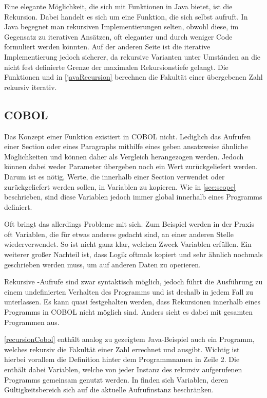 
Eine elegante Möglichkeit, die sich mit Funktionen in Java bietet, ist die Rekursion. Dabei handelt es sich um eine Funktion, die sich selbst aufruft. In Java begegnet man rekursiven Implementierungen selten, obwohl diese, im Gegensatz zu iterativen Ansätzen, oft eleganter und durch weniger Code formuliert werden könnten. Auf der anderen Seite ist die iterative Implementierung jedoch sicherer, da rekursive Varianten unter Umständen an die nicht fest definierte Grenze der maximalen Rekursionstiefe gelangt. Die Funktionen  und  in \autoref{javaRecursion} berechnen die Fakultät einer übergebenen Zahl rekursiv \bzw iterativ.

\subsection*{COBOL}
Das Konzept einer Funktion existiert in COBOL nicht. Lediglich das Aufrufen einer Section oder eines Paragraphs mithilfe eines  geben ansatzweise ähnliche Möglichkeiten und können daher als Vergleich herangezogen werden. Jedoch können dabei weder Parameter übergeben noch ein Wert zurückgeliefert werden. Darum ist es nötig, Werte, die innerhalb einer Section verwendet oder zurückgeliefert werden sollen, in Variablen zu kopieren. Wie in \autoref{sec:scope} beschrieben, sind diese Variablen jedoch immer global innerhalb eines Programms definiert.

Oft bringt das allerdings Probleme mit sich. Zum Beispiel werden in der Praxis oft Variablen, die für etwas anderes gedacht sind, an einer anderen Stelle wiederverwendet. So ist nicht ganz klar, welchen Zweck Variablen erfüllen. Ein weiterer großer Nachteil ist, dass Logik oftmals kopiert und sehr ähnlich nochmals geschrieben werden muss, um auf anderen Daten zu operieren.


Rekursive -Aufrufe sind zwar syntaktisch möglich, jedoch führt die Ausführung zu einem undefinierten Verhalten des Programms und ist deshalb in jedem Fall zu unterlassen. Es kann quasi festgehalten werden, dass Rekursionen innerhalb eines Programms in COBOL nicht möglich sind. Anders sieht es dabei mit gesamten Programmen aus.

\autoref{recursionCobol} enthält analog zu gezeigtem Java-Beispiel auch ein Programm, welches rekursiv die Fakultät einer Zahl errechnet und ausgibt. Wichtig ist hierbei vorallem die  Definition hinter dem Programmnamen in Zeile 2. Die  enthält dabei Variablen, welche von jeder Instanz des rekursiv aufgerufenen Programms gemeinsam genutzt werden. In  finden sich Variablen, deren Gültigkeitsbereich sich auf die aktuelle Aufrufinstanz beschränken.

